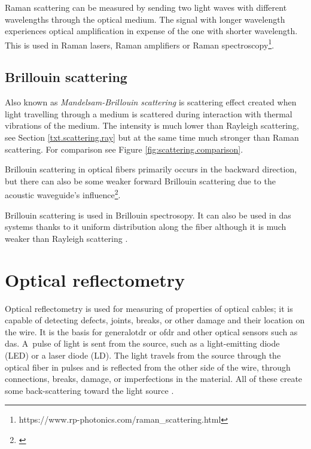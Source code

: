 
Raman scattering can be measured by sending two light waves with different wavelengths through the optical medium. The  signal with longer wavelength experiences optical amplification in expense of the one with shorter wavelength. This is used in Raman lasers, Raman amplifiers or Raman spectroscopy\footnote{https://www.rp-photonics.com/raman\_scattering.html}.


\subsection{Brillouin scattering}\label{txt.scattering.bril}


Also known as \textit{Mandelsam-Brillouin scattering} is scattering effect created when light travelling through a medium is scattered during interaction with thermal vibrations of the medium. The intensity is much lower than Rayleigh scattering, see Section \ref{txt.scattering.ray} but at the same time much stronger than Raman scattering. For comparison see Figure \ref{fig:scattering.comparison}. 

Brillouin scattering in optical fibers primarily occurs in the backward direction, but there can also be some weaker forward Brillouin scattering due to the acoustic waveguide's influence\footnote{\cite{bhundred}}.

Brillouin scattering is used in Brillouin spectrosopy. It can also be used in \ac{das} systems thanks to it uniform distribution along the fiber although it is much weaker than Rayleigh scattering \cite{dasKislov}.


\section{Optical reflectometry}\label{txt.reflectometry}

Optical reflectometry is used for measuring of properties of optical cables; it is capable of detecting defects, joints, breaks, or other damage and their location on the wire. It is the basis for \ac{generalotdr} or \ac{ofdr} and other optical sensors such as \ac{das}. A~pulse of light is sent from the source, such as a light-emitting diode (LED) or a laser diode (LD). The light travels from the source through the optical fiber in pulses and is reflected from the other side of the wire, through connections, breaks, damage, or imperfections in the material. All of these create some back-scattering toward the light source \cite{progress}. 


